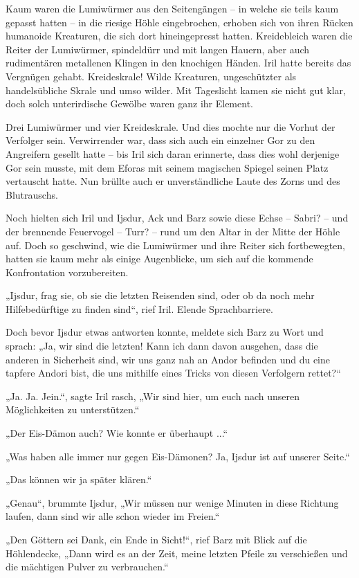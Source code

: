 Kaum waren die Lumiwürmer aus den Seitengängen – in welche sie teils kaum gepasst hatten – in die riesige Höhle eingebrochen, erhoben sich von ihren Rücken humanoide Kreaturen, die sich dort hineingepresst hatten. Kreidebleich waren die Reiter der Lumiwürmer, spindeldürr und mit langen Hauern, aber auch rudimentären metallenen Klingen in den knochigen Händen. Iril hatte bereits das Vergnügen gehabt. Kreideskrale! Wilde Kreaturen, ungeschützter als handelsübliche Skrale und umso wilder. Mit Tageslicht kamen sie nicht gut klar, doch solch unterirdische Gewölbe waren ganz ihr Element.

Drei Lumiwürmer und vier Kreideskrale. Und dies mochte nur die Vorhut der Verfolger sein. Verwirrender war, dass sich auch ein einzelner Gor zu den Angreifern gesellt hatte – bis Iril sich daran erinnerte, dass dies wohl derjenige Gor sein musste, mit dem Eforas mit seinem magischen Spiegel seinen Platz vertauscht hatte. Nun brüllte auch er unverständliche Laute des Zorns und des Blutrauschs.

Noch hielten sich Iril und Ijsdur, Ack und Barz sowie diese Echse – Sabri? – und der brennende Feuervogel – Turr? – rund um den Altar in der Mitte der Höhle auf. Doch so geschwind, wie die Lumiwürmer und ihre Reiter sich fortbewegten, hatten sie kaum mehr als einige Augenblicke, um sich auf die kommende Konfrontation vorzubereiten.

„Ijsdur, frag sie, ob sie die letzten Reisenden sind, oder ob da noch mehr Hilfebedürftige zu finden sind“, rief Iril. Elende Sprachbarriere.

Doch bevor Ijsdur etwas antworten konnte, meldete sich Barz zu Wort und sprach: „Ja, wir sind die letzten! Kann ich dann davon ausgehen, dass die anderen in Sicherheit sind, wir uns ganz nah an Andor befinden und du eine tapfere Andori bist, die uns mithilfe eines Tricks von diesen Verfolgern rettet?“

„Ja. Ja. Jein.“, sagte Iril rasch, „Wir sind hier, um euch nach unseren Möglichkeiten zu unterstützen.“

„Der Eis-Dämon auch? Wie konnte er überhaupt ...“

„Was haben alle immer nur gegen Eis-Dämonen? Ja, Ijsdur ist auf unserer Seite.“

„Das können wir ja später klären.“

„Genau“, brummte Ijsdur, „Wir müssen nur wenige Minuten in diese Richtung laufen, dann sind wir alle schon wieder im Freien.“

„Den Göttern sei Dank, ein Ende in Sicht!“, rief Barz mit Blick auf die Höhlendecke, „Dann wird es an der Zeit, meine letzten Pfeile zu verschießen und die mächtigen Pulver zu verbrauchen.“

